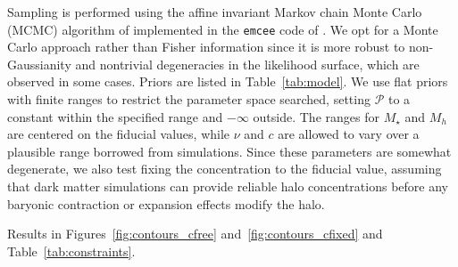 \documentclass[12pt]{emulateapj}
\begin{document}
Sampling is performed using the
affine invariant Markov chain Monte Carlo (MCMC) algorithm of
\citet{Goodman2010} implemented in the {\tt emcee} code of
\citet{Foreman-Mackey2013}. We opt for a Monte Carlo approach rather
than Fisher information since it is more robust to non-Gaussianity and
nontrivial degeneracies in the likelihood surface, which are observed
in some cases. Priors are listed in Table~\ref{tab:model}. We use flat
priors with finite ranges to restrict the parameter space
searched, setting ${\mathcal P}$ to a constant within the specified
range and $-\infty$ outside. The ranges for $M_{\star}$ and $M_h$ are centered on the
fiducial values, while $\nu$ and $c$ are allowed to vary over a
plausible range borrowed from simulations. Since these parameters are
somewhat degenerate, we also test fixing the concentration to the
fiducial value, assuming that dark matter simulations can provide
reliable halo concentrations before any baryonic contraction or
expansion effects modify the halo.

Results in Figures~\ref{fig:contours_cfree}
and~\ref{fig:contours_cfixed} and Table~\ref{tab:constraints}. 

\begin{figure*}[htb]
\caption{[PLACEHOLDER: FIDUCIAL PARAMETERS AND PRIORS ARE NOT THE
  SAME AS TABLE~\ref{tab:model}] Posterior distributions for model
  parameters from MCMC fit with the fiducial Galaxy model, LSST survey
  parameters, $R_{\rm min}=40\,{\rm kpc}$, and $\Gamma=0.5(?)$. Contraints are from $\Sigma(R)$ (red),
  $\Delta\Sigma(R)$ (green), and the combined data (blue). The top
  column in each panel shows the arbitrarily normalized one-dimensional posterior for each
  parameter while marginalizing over other parameters, and lower
  panels show the $68\%$ and $95\%$ contours of the joint posterior distribution
  for each pair of parameters. $M_{\star}$ and $M_h$ are
  well-constrained (except $M_{\star}$ with $\Sigma(R)$ only), while
  $c$ and $\nu$ are degenerate and unconstrained by the data.}
\label{fig:contours_cfree}
\end{figure*}

\begin{figure*}[htb]
\caption{Same as Figure~\ref{fig:contours_cfree} but with $c$ fixed to
the fiducial value from simulations. If $c$ is known for the dark
matter halo prior to baryonic contraction or expansion, then $\nu$ can
be constrained.}
\label{fig:contours_cfixed}
\end{figure*}
\end{document}

